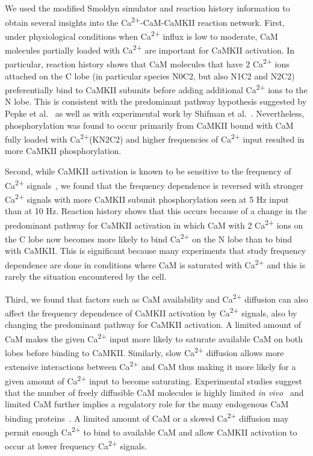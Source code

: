 \documentclass[10pt,letterpaper]{article}
\begin{document}
We used the modified Smoldyn simulator and reaction history information to obtain several insights into the Ca\textsuperscript{2+}-CaM-CaMKII reaction network. First, under physiological conditions when Ca\textsuperscript{2+} influx is low to moderate, CaM molecules partially loaded with Ca\textsuperscript{2+} are important for CaMKII activation. In particular, reaction history shows that CaM molecules that have 2 Ca\textsuperscript{2+} ions attached on the C lobe (in particular species N0C2, but also N1C2 and N2C2) preferentially bind to CaMKII subunits before adding additional Ca\textsuperscript{2+} ions to the N lobe. This is consistent with the predominant pathway hypothesis suggested by Pepke et al.~\cite{Pepke:2010ju} as well as with experimental work by Shifman et al.~\cite{Shifman:2006hw}. Nevertheless, phosphorylation was found to occur primarily from CaMKII bound with CaM fully loaded with Ca\textsuperscript{2+}(KN2C2) and higher frequencies of Ca\textsuperscript{2+} input resulted in more CaMKII phosphorylation.

Second, while CaMKII activation is known to be sensitive to the frequency of Ca\textsuperscript{2+} signals~\cite{DeKoninck:1998wh}, we found that the frequency dependence is reversed with stronger Ca\textsuperscript{2+} signals with more CaMKII subunit phosphorylation seen at 5 Hz input than at 10 Hz. Reaction history shows that this occurs because of a change in the predominant pathway for CaMKII activation in which CaM with 2 Ca\textsuperscript{2+} ions on the C lobe now becomes more likely to bind Ca\textsuperscript{2+} on the N lobe than to bind with CaMKII. This is significant because many experiments that study frequency dependence are done in conditions where CaM is saturated with Ca\textsuperscript{2+} and this is rarely the situation encountered by the cell.

Third, we found that factors such as CaM availability and Ca\textsuperscript{2+} diffusion can also affect the frequency dependence of CaMKII activation by Ca\textsuperscript{2+} signals, also by changing the predominant pathway for CaMKII activation. A limited amount of CaM makes the given Ca\textsuperscript{2+} input more likely to saturate available CaM on both lobes before binding to CaMKII. Similarly, slow Ca\textsuperscript{2+} diffusion allows more extensive interactions between Ca\textsuperscript{2+} and CaM thus making it more likely for a given amount of Ca\textsuperscript{2+} input to become saturating. Experimental studies suggest that the number of freely diffusible CaM molecules is highly limited \textit{in vivo}~\cite{2008BpJ....95.6002S,Persechini:2002tb,LubyPhelps:1995kl} and limited CaM further implies a regulatory role for the many endogenous CaM binding proteins~\cite{Skene:1990kf}. A limited amount of CaM or a slowed Ca\textsuperscript{2+} diffusion may permit enough Ca\textsuperscript{2+} to bind to available CaM and allow CaMKII activation to occur at lower frequency Ca\textsuperscript{2+} signals.
\end{document}
